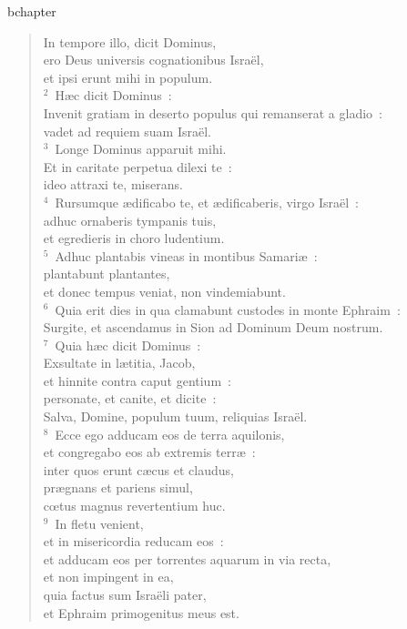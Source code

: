 bchapter\begin{verse}\vspace{-19pt}In tempore illo, dicit Dominus,\\ ero Deus universis cognationibus Isra\"el,\\ et ipsi erunt mihi in populum.\\
${}^{2}$~H\ae c dicit Dominus~:\\ Invenit gratiam in deserto populus qui remanserat a gladio~:\\ vadet ad requiem suam Isra\"el.\\
${}^{3}$~Longe Dominus apparuit mihi.\\ Et in caritate perpetua dilexi te~:\\ ideo attraxi te, miserans.\\
${}^{4}$~Rursumque \ae dificabo te, et \ae dificaberis, virgo Isra\"el~:\\ adhuc ornaberis tympanis tuis,\\ et egredieris in choro ludentium.\\
${}^{5}$~Adhuc plantabis vineas in montibus Samari\ae~:\\ plantabunt plantantes,\\ et donec tempus veniat, non vindemiabunt.\\
${}^{6}$~Quia erit dies in qua clamabunt custodes in monte Ephraim~:\\ Surgite, et ascendamus in Sion ad Dominum Deum nostrum.\\
${}^{7}$~Quia h\ae c dicit Dominus~:\\ Exsultate in l\ae titia, Jacob,\\ et hinnite contra caput gentium~:\\ personate, et canite, et dicite~:\\ Salva, Domine, populum tuum, reliquias Isra\"el.\\
${}^{8}$~Ecce ego adducam eos de terra aquilonis,\\ et congregabo eos ab extremis terr\ae~:\\ inter quos erunt c\ae cus et claudus,\\ pr\ae gnans et pariens simul,\\ cœtus magnus revertentium huc.\\
${}^{9}$~In fletu venient,\\ et in misericordia reducam eos~:\\ et adducam eos per torrentes aquarum in via recta,\\ et non impingent in ea,\\ quia factus sum Isra\"eli pater,\\ et Ephraim primogenitus meus est.\\

\end{verse}
